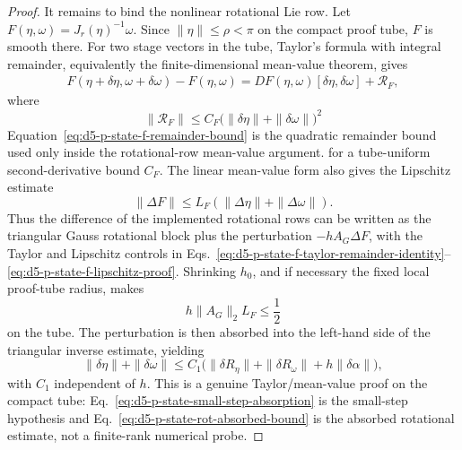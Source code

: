 \documentclass[preprint,12pt]{elsarticle}
\begin{document}
\begin{proof}
It remains to bind the nonlinear rotational Lie row.  Let
\(F(\eta,\omega)=J_r(\eta)^{-1}\omega\).  Since
\(\|\eta\|\le\rho<\pi\) on the compact proof tube, \(F\) is smooth there.
For two stage vectors in the tube, Taylor's formula with integral remainder,
equivalently the finite-dimensional mean-value theorem, gives
\begin{align}
\label{eq:d5-p-state-f-taylor-remainder-identity}
  F(\eta+\delta\eta,\omega+\delta\omega)-F(\eta,\omega)
  =DF(\eta,\omega)[\delta\eta,\delta\omega]
   +\mathcal R_F,
\end{align}
where
\begin{equation}
\label{eq:d5-p-state-f-remainder-bound}
  \|\mathcal R_F\|
  \le C_F\bigl(\|\delta\eta\|+\|\delta\omega\|\bigr)^2
\end{equation}
Equation~\eqref{eq:d5-p-state-f-remainder-bound} is the quadratic remainder
bound used only inside the rotational-row mean-value argument.
for a tube-uniform second-derivative bound \(C_F\).  The linear mean-value
form also gives the Lipschitz estimate
\begin{equation}
\label{eq:d5-p-state-f-lipschitz-proof}
  \|\Delta F\|\le L_F(\|\Delta\eta\|+\|\Delta\omega\|).
\end{equation}
Thus the difference of the implemented rotational rows can be written as the
triangular Gauss rotational block plus the perturbation
\(-hA_G\Delta F\), with the Taylor and Lipschitz controls in
Eqs.~\eqref{eq:d5-p-state-f-taylor-remainder-identity}--\eqref{eq:d5-p-state-f-lipschitz-proof}.
Shrinking \(h_0\), and if necessary the fixed local
proof-tube radius, makes
\begin{equation}
\label{eq:d5-p-state-small-step-absorption}
  h\|A_G\|_2L_F\le \frac12
\end{equation}
on the tube.  The perturbation is then absorbed into the left-hand side of
the triangular inverse estimate, yielding
\begin{equation}
\label{eq:d5-p-state-rot-absorbed-bound}
  \|\delta\eta\|+\|\delta\omega\|
  \le C_1\bigl(\|\delta R_\eta\|+\|\delta R_\omega\|
       +h\|\delta\alpha\|\bigr),
\end{equation}
with \(C_1\) independent of \(h\).  This is a genuine Taylor/mean-value proof
on the compact tube: Eq.~\eqref{eq:d5-p-state-small-step-absorption} is the
small-step hypothesis and Eq.~\eqref{eq:d5-p-state-rot-absorbed-bound} is the
absorbed rotational estimate, not a finite-rank numerical probe.


\end{proof}
\end{document}
